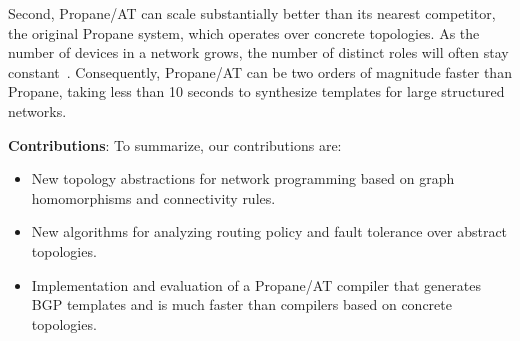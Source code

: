 \documentclass[numbers, 10pt, preprint]{sigplanconf}
\newcommand{\sysname}{{\text{}\small \sf Propane/AT}\xspace}
\newcommand{\Propane}{{\text{}\small \sf Propane}\xspace}
\begin{document}
Second, \sysname can scale substantially better than its nearest competitor, the original \Propane system, 
which operates over concrete topologies. As the number of devices in a
network grows, the number of distinct roles will often stay constant~\cite{surgery}.
Consequently, \sysname can be two orders of magnitude
faster than \Propane, taking less than 10 seconds to synthesize templates for large structured networks.


\vspace{1em}
\noindent
\textbf{Contributions}: To summarize, our contributions are:
%
\begin{itemize}[noitemsep,nolistsep,label={\large\textbullet}]
\item New topology abstractions for network programming
based on graph homomorphisms and connectivity rules.
\item New algorithms for analyzing routing policy and fault tolerance over
abstract topologies.
\item Implementation and evaluation of a \sysname compiler that generates
BGP templates and is much faster
than compilers based on concrete topologies.
\end{itemize}




%
%
%
%
\end{document}
